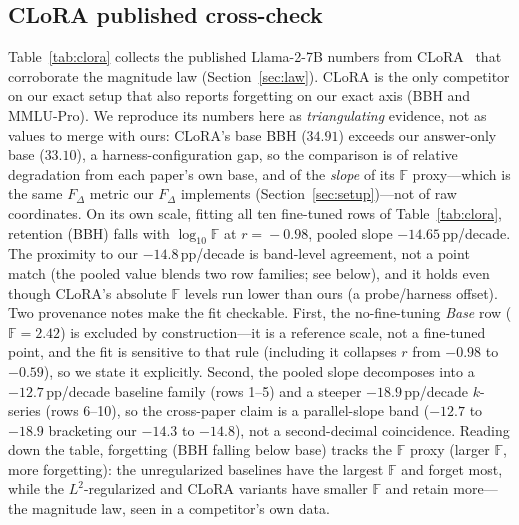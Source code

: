 \documentclass[11pt]{article}
\newcommand{\dw}{F_{\Delta}}
\begin{document}
\subsection{CLoRA published cross-check}\label{app:clora}
Table~\ref{tab:clora} collects the published Llama-2-7B numbers from
CLoRA~\citep{clora} that corroborate the magnitude law
(Section~\ref{sec:law}). CLoRA is the only competitor on our exact setup that also
reports forgetting on our exact axis (BBH and MMLU-Pro). We reproduce its numbers
here as \emph{triangulating} evidence, not as values to merge with ours: CLoRA's
base BBH ($34.91$) exceeds our answer-only base ($33.10$), a harness-configuration
gap, so the comparison is of relative degradation from each paper's own base, and
of the \emph{slope} of its $\mathbb{F}$ proxy---which is the same $F_\Delta$ metric
our $\dw$ implements (Section~\ref{sec:setup})---not of raw coordinates. On its own
scale, fitting all ten fine-tuned rows of Table~\ref{tab:clora}, retention (BBH)
falls with $\log_{10}\mathbb{F}$ at $r\!=\!-0.98$, pooled slope
$-14.65$\,pp/decade. The proximity to our $-14.8$\,pp/decade is band-level
agreement, not a point match (the pooled value blends two row families; see
below), and it holds even though CLoRA's absolute $\mathbb{F}$ levels run lower
than ours (a probe/harness offset). Two provenance
notes make the fit checkable. First, the no-fine-tuning \emph{Base} row
($\mathbb{F}\!=\!2.42$) is excluded by construction---it is a reference scale,
not a fine-tuned point, and the fit is sensitive to that rule (including it
collapses $r$ from $-0.98$ to $-0.59$), so we state it explicitly. Second, the pooled slope
decomposes into a $-12.7$\,pp/decade baseline family (rows 1--5) and a steeper
$-18.9$\,pp/decade $k$-series (rows 6--10), so the cross-paper claim is a
parallel-slope band ($-12.7$ to $-18.9$ bracketing our $-14.3$ to $-14.8$),
not a second-decimal coincidence. Reading down the
table, forgetting (BBH
falling below base) tracks the $\mathbb{F}$ proxy (larger $\mathbb{F}$,
more forgetting): the unregularized baselines have the largest $\mathbb{F}$ and
forget most, while
the $L^2$-regularized and CLoRA variants have smaller $\mathbb{F}$ and retain
more---the magnitude law, seen in a competitor's own data.
\end{document}
